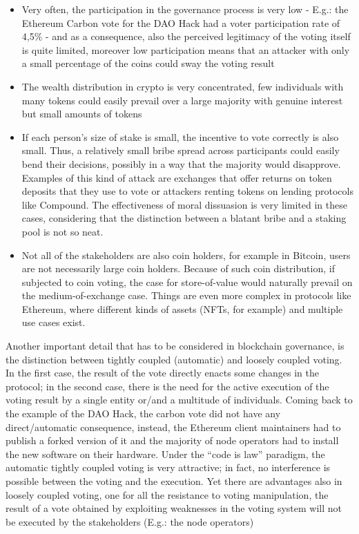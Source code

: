 \documentclass{article}
\begin{document}
\begin{itemize}

\item Very often, the participation in the governance process is very low - E.g.: the Ethereum Carbon vote for the DAO Hack had a voter participation rate of 4,5\% -  and as a consequence, also the perceived legitimacy of the voting itself is quite limited, moreover low participation means that an attacker with only a small percentage of the coins could sway the voting result

\item The wealth distribution in crypto is very concentrated, few individuals with many tokens could easily prevail over a large majority with genuine interest but small amounts of tokens

\item If each person’s size of stake is small, the incentive to vote correctly is also small. Thus, a relatively small bribe spread across participants could easily bend their decisions, possibly in a way that the majority would disapprove. Examples of this kind of attack are exchanges that offer returns on token deposits that they use to vote or attackers renting tokens on lending protocols like Compound. The effectiveness of moral dissuasion is very limited in these cases, considering that the distinction between a blatant bribe and a staking pool is not so neat. 

\item Not all of the stakeholders are also coin holders, for example in Bitcoin, users are not necessarily large coin holders. Because of such coin distribution, if subjected to coin voting, the case for store-of-value would naturally prevail on the medium-of-exchange case. Things are even more complex in protocols like Ethereum, where different kinds of assets (NFTs, for example) and multiple use cases exist. 

\end{itemize}

Another important detail that has to be considered in blockchain governance, is the distinction between tightly coupled (automatic) and loosely coupled voting. In the first case, the result of the vote directly enacts some changes in the protocol; in the second case, there is the need for the active execution of the voting result by a single entity or/and a multitude of individuals. Coming back to the example of the DAO Hack, the carbon vote did not have any direct/automatic consequence, instead, the Ethereum client maintainers had to publish a forked version of it and the majority of node operators had to install the new software on their hardware. Under the “code is law” paradigm, the automatic tightly coupled voting is very attractive; in fact, no interference is possible between the voting and the execution. Yet there are advantages also in loosely coupled voting, one for all the resistance to voting manipulation, the result of a vote obtained by exploiting weaknesses in the voting system will not be executed by the stakeholders (E.g.: the node operators) 
\end{document}
